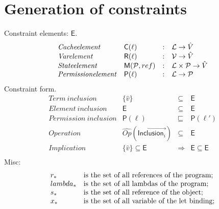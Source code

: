 \documentclass[[12pt,a4paper,twoside,openrigh]{article}
\newcommand{\vat}[0]{\hat{v}}
\begin{document}
\section{Generation of constraints}
\newcommand{\genl}[1]{\mathcal{C}_*\llbracket (#1)^\ell \rrbracket}
\newcommand{\gen}[1]{\mathcal{C}_*\llbracket (#1) \rrbracket}
\newcommand{\Cel}{\mathsf{C}}
\newcommand{\Rel}{\mathsf{R}}
\newcommand{\Pel}{\mathsf{P}}
\newcommand{\Mel}{\mathsf{M}}
\newcommand{\El}{\mathsf{E}}
Constraint elements: $\El$.
\[
\begin{array}{llcl}
\mathit{Cache element} & \Cel(\ell)& : & \labs \rightarrow \absvalues \\
\mathit{Var element} & \Rel(\ell) & : & \vars \rightarrow \absvalues \\
\mathit{State element} & \Mel(\perms, ref) & : & \labs \times \perms \rightarrow \absvalues \\
\mathit{Permission element} & \Pel(\ell) & : & \labs \rightarrow \perms \\
\end{array}
\]
Constraint form.
\[
\begin{array}{lrcl}
\mathit{Term\ inclusion} & \{\vat\} & \subseteq & \El \\
\mathit{Element\ inclusion} & \El & \subseteq & \El \\
\mathit{Permission\ inclusion} & \Pel(\ell) & \sqsubseteq & \Pel(\ell') \\
\mathit{Operation} & \widehat{Op}(\vec{\mathsf{Inclusion}_i}) & \subseteq & \El \\
\mathit{Implication} & \{\vat\} \subseteq \El & \Rightarrow & \El \subseteq \El \\
\end{array}
\]
Misc:
\[
\begin{array}{l l}
r_* & $is the set of all references of the program;$\\
lambda_* & $is the set of all lambdas of the program;$\\
s_* & $is the set of all reference of the object;$\\
x_* & $is the set of all variable of the let binding;$\\
\end{array}
\]
\end{document}

